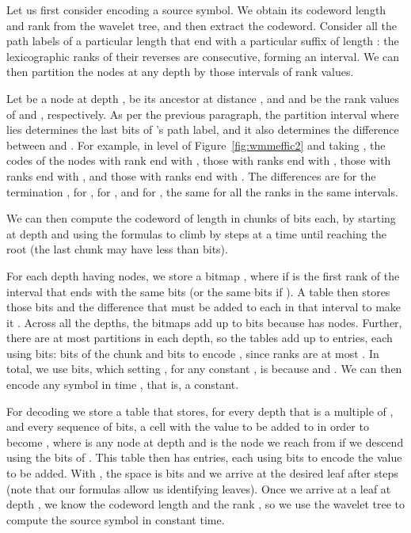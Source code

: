 \documentclass[preprint,12pt]{elsarticle}
\begin{document}
Let us first consider encoding a source symbol. We obtain its codeword length
 and rank  from the wavelet tree, and then extract the codeword.
Consider all the path labels of a particular length that end with a particular 
suffix of length : the lexicographic ranks of their reverses are consecutive,
forming an interval. We can then partition the nodes at any depth  by 
those intervals of rank values. 

Let  be a node at depth ,  be its ancestor at distance , and  
and  be the rank values of  and , respectively. As per the previous
paragraph, the partition interval where  lies determines the last  bits
of 's path label, and it also determines the difference between  and 
. For example, in level  of Figure~\ref{fig:wmmeffic2} and taking
, the codes of the nodes  with rank  end with , those 
with ranks  end with , those with ranks  end with , 
and those with ranks  end with . The differences  are
 for the termination ,  for ,  for , and  for 
, the same for all the ranks in the same intervals.

We can then compute the codeword of length  in  chunks of  bits
each, by starting at depth  and using the formulas to climb by  
steps at a time until reaching the root (the last chunk may have less than 
bits).

For each depth  having  nodes, we store a bitmap , where
 if  is the first rank of the interval that ends with the same 
 bits (or the same  bits if ). A table 
 then stores those  bits and 
the difference that must be added to each  in that interval to make it
. Across all the depths, the bitmaps  add up to  bits
because  has  nodes.
Further, there are at most  partitions in each depth, so the tables 
 add up to  entries, each using  bits:
 bits of the chunk and  bits to encode , since 
ranks are at most .
In total, we use  bits, which setting 
, for any constant , is 
 because  and . 
We can then encode any symbol in time
, that is, a constant.

For decoding we store a table that stores, for every depth  that is a 
multiple of , and every sequence  of  bits, a cell  with
the value to be added to  in order to become , where  is any
node at depth  and  is the node we reach from  if we 
descend using the  bits of .  This table then has  
entries, each using  bits to encode the value to be added. 
With , the space is  bits and we arrive 
at the desired leaf after  steps (note that our formulas allow 
us identifying leaves). Once we arrive at a leaf at depth , we know the 
codeword length  and the rank , so we use the wavelet tree to 
compute the source symbol in constant time.
\end{document}
